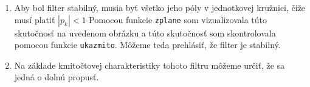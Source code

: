 \documentclass[10pt, a4paper, twocolumn]{article}
\begin{document}
\begin{enumerate}[leftmargin=*]
\item Aby bol filter stabilný, musia byť všetko jeho póly v jednotkovej kružnici, čiže musí platiť  $|p_k| < 1$ Pomocou funkcie \texttt{zplane} som vizualizovala túto skutočnosť na uvedenom obrázku a túto skutočnosť som skontrolovala pomocou funkcie \texttt{ukazmito}. Môžeme teda prehlásiť, že filter je stabilný.
\begin{figure}[H]
\centering
{}
\end{figure}

\item Na základe kmitočtovej charakteristiky tohoto filtru môžeme určiť, že sa jedná o dolnú propusť.
\begin{figure}[H]
\centering
{}
\end{figure}


\end{enumerate}
\end{document}

